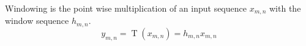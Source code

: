 Windowing is the point wise multiplication of an input sequence $x_{m,n}$ with the window sequence $h_{m,n}$.
$$y_{m,n} = \operatorname{T}(x_{m,n}) = h_{m,n} x_{m,n}$$
